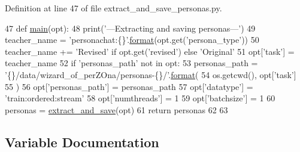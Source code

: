 Definition at line 47 of file extract\+\_\+and\+\_\+save\+\_\+personas.\+py.


\begin{DoxyCode}
47 \textcolor{keyword}{def }\hyperlink{namespacepersonachat__eval_1_1extract__and__save__personas_aa39f496bc78dfa28c1fbc2c4129a915c}{main}(opt):
48     print(\textcolor{stringliteral}{'---Extracting and saving personas---'})
49     teacher\_name = \textcolor{stringliteral}{'personachat:\{\}'}.\hyperlink{namespaceparlai_1_1chat__service_1_1services_1_1messenger_1_1shared__utils_a32e2e2022b824fbaf80c747160b52a76}{format}(opt.get(\textcolor{stringliteral}{'persona\_type'}))
50     teacher\_name += \textcolor{stringliteral}{'Revised'} \textcolor{keywordflow}{if} opt.get(\textcolor{stringliteral}{'revised'}) \textcolor{keywordflow}{else} \textcolor{stringliteral}{'Original'}
51     opt[\textcolor{stringliteral}{'task'}] = teacher\_name
52     \textcolor{keywordflow}{if} \textcolor{stringliteral}{'personas\_path'} \textcolor{keywordflow}{not} \textcolor{keywordflow}{in} opt:
53         personas\_path = \textcolor{stringliteral}{'\{\}/data/wizard\_of\_perZOna/personas-\{\}/'}.\hyperlink{namespaceparlai_1_1chat__service_1_1services_1_1messenger_1_1shared__utils_a32e2e2022b824fbaf80c747160b52a76}{format}(
54             os.getcwd(), opt[\textcolor{stringliteral}{'task'}]
55         )
56         opt[\textcolor{stringliteral}{'personas\_path'}] = personas\_path
57     opt[\textcolor{stringliteral}{'datatype'}] = \textcolor{stringliteral}{'train:ordered:stream'}
58     opt[\textcolor{stringliteral}{'numthreads'}] = 1
59     opt[\textcolor{stringliteral}{'batchsize'}] = 1
60     personas = \hyperlink{namespacepersonachat__eval_1_1extract__and__save__personas_a7bae99c34a0b3f49cbce1328146926fd}{extract\_and\_save}(opt)
61     \textcolor{keywordflow}{return} personas
62 
63 
\end{DoxyCode}


\subsection{Variable Documentation}
\mbox{\label{namespaceparlai_1_1mturk_1_1tasks_1_1wizard__of__wikipedia_1_1extract__and__save__personas_a97a557266316a9d1bbb85316c3c68f8a}} 
